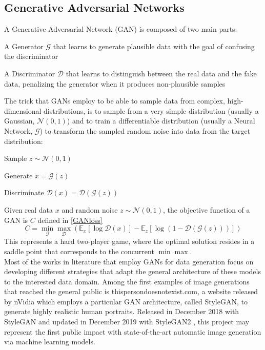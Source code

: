 \documentclass[conference]{IEEEtran}
\begin{document}
\subsection{Generative Adversarial Networks}
A Generative Adversarial Network (GAN) \cite{GANs} is composed of two main parts: \begin{list}{-}{}
	\item A Generator $\mathcal{G}$ that learns to generate plausible data with the goal of confusing the discriminator
	\item A Discriminator $\mathcal{D}$ that learns to distinguish between the real data and the fake data, penalizing the generator when it produces non-plausible samples
\end{list}
The trick that GANs employ to be able to sample data from complex, high-dimensional distributions, is to sample from a very simple distribution (usually a Gaussian, $\mathcal{N}(0, 1)$) and to train a differentiable distribution (usually a Neural Network, $\mathcal{G}$) to transform the sampled random noise into data from the target distribution: \begin{list}{-}{}
	\item Sample $z\sim\mathcal{N}(0,1)$
	\item Generate $x=\mathcal{G}(z)$
	\item Discriminate $\mathcal{D}(x) = \mathcal{D}(\mathcal{G}(z))$
\end{list}
Given real data $x$ and random noise $z\sim\mathcal{N}(0,1)$, the objective function of a GAN is $C$ defined in \eqref{GANloss}
\begin{equation}
C = \min_\mathcal{G}\max_\mathcal{D}\left( \mathbb{E}_x[\log\mathcal{D}(x)] -\mathbb{E}_z[\log (1-\mathcal{D}(\mathcal{G}(z)))] \right) \label{GANloss}
\end{equation}
This represents a hard two-player game, where the optimal solution resides in a saddle point that corresponds to the concurrent $\min\max$.\\
Most of the works in literature that employ GANs for data generation focus on developing different strategies that adapt the general architecture of these models to the interested data domain. Among the first examples of image generations that reached the general public is thispersondoesnotexist.com, a website released by nVidia which employs a particular GAN architecture, called StyleGAN, to generate highly realistic human portraits. Released in December 2018 with StyleGAN \cite{stylegan} and updated in December 2019 with StyleGAN2 \cite{stylegan2}, this project may represent the first public impact with state-of-the-art automatic image generation via machine learning models.\\
\end{document}
